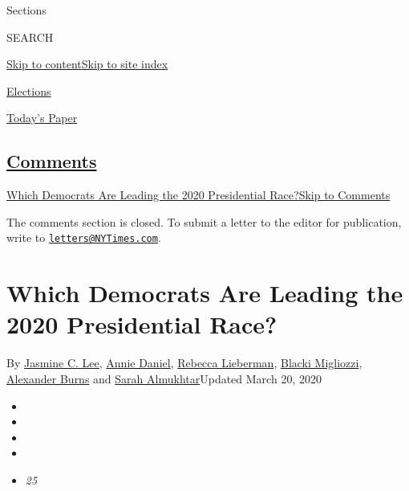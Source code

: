 Sections

SEARCH

\protect\hyperlink{site-content}{Skip to
content}\protect\hyperlink{site-index}{Skip to site index}

\href{https://www.nytimes3xbfgragh.onion/news-event/2020-election}{Elections}

\href{https://myaccount.nytimes3xbfgragh.onion/auth/login?response_type=cookie\&client_id=vi}{}

\href{https://www.nytimes3xbfgragh.onion/section/todayspaper}{Today's
Paper}

\hypertarget{comments}{%
\subsection{\texorpdfstring{\protect\hyperlink{commentsContainer}{Comments}}{Comments}}\label{comments}}

\href{}{Which Democrats Are Leading the 2020 Presidential
Race?}\href{}{Skip to Comments}

The comments section is closed. To submit a letter to the editor for
publication, write to
\href{mailto:letters@NYTimes.com}{\nolinkurl{letters@NYTimes.com}}.

\hypertarget{which-democrats-are-leading-the-2020-presidential-race}{%
\section{Which Democrats Are Leading the 2020 Presidential
Race?}\label{which-democrats-are-leading-the-2020-presidential-race}}

By \href{https://www.nytimes3xbfgragh.onion/by/jasmine-c-lee}{Jasmine C.
Lee}, \href{https://www.nytimes3xbfgragh.onion/by/annie-daniel}{Annie
Daniel},
\href{https://www.nytimes3xbfgragh.onion/by/rebecca-lieberman}{Rebecca
Lieberman},
\href{https://www.nytimes3xbfgragh.onion/by/blacki-migliozzi}{Blacki
Migliozzi},
\href{https://www.nytimes3xbfgragh.onion/by/alexander-burns}{Alexander
Burns} and
\href{https://www.nytimes3xbfgragh.onion/by/sarah-almukhtar}{Sarah
Almukhtar}Updated March 20, 2020

\begin{itemize}
\item
\item
\item
\item
\item
  \emph{25}
\end{itemize}

